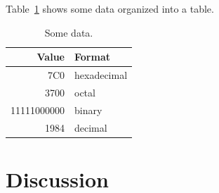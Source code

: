 \documentclass[twocolumn,letterpaper]{article}
\begin{document}
\lipsum[1-2]

Table~\ref{tab:randomjunk} shows some data organized into a table.

\begin{table}
  \centering
  \begin{tabular}{|r|l|}
    \hline
    \textbf{Value} & \textbf{Format}\\
    \hline\hline
  7C0 & hexadecimal \\
  3700 & octal \\ \cline{2-2}
  11111000000 & binary \\
  \hline
  1984 & decimal \\
  \hline
  \end{tabular}
  \caption{Some data.}
  \label{tab:randomjunk}
\end{table}

\lipsum[1-2]

\section*{Discussion}

\lipsum[1-10]



\end{document}

